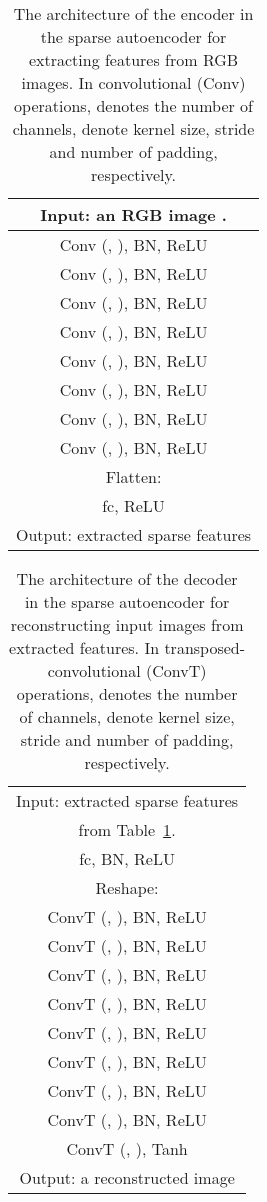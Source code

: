 \documentclass[final,12pt, 3p,times]{elsarticle}
\begin{document}
\begin{table}[h]
	\centering
	\caption{The architecture of the encoder in the sparse autoencoder for extracting features from  RGB images. In convolutional (Conv) operations,  denotes the number of channels,  denote kernel size, stride and number of padding, respectively. }
\begin{tabular}{c}
			\toprule
			Input: an RGB image . \\ 
			\hline
			Conv (, ), BN, ReLU \\\hline
			Conv (, ), BN, ReLU \\\hline
			Conv (, ), BN, ReLU \\\hline
			Conv (, ), BN, ReLU \\\hline
			Conv (, ), BN, ReLU \\\hline
			Conv (, ), BN, ReLU \\\hline
			Conv (, ), BN, ReLU \\\hline
			Conv (, ), BN, ReLU \\ \hline
			Flatten:  \\ \hline
			fc, ReLU \\\hline
			Output: extracted sparse features 
			\\ \bottomrule
		\end{tabular}\label{tab:SparseAE_encoder_64x64}\end{table}

\begin{table}[h]
	\centering
	\caption{The architecture of the decoder in the sparse autoencoder for reconstructing  input images from extracted features. In transposed-convolutional (ConvT) operations,  denotes the number of channels,  denote kernel size, stride and number of padding, respectively. }
\begin{tabular}{c}
			\toprule
			Input: extracted sparse features  
			\\ from Table~\ref{tab:SparseAE_encoder_64x64}. \\
			\hline
			fc, BN, ReLU \\\hline
			Reshape: \\ \hline
			ConvT (, ), BN, ReLU \\\hline
			ConvT (, ), BN, ReLU \\\hline
			ConvT (, ), BN, ReLU \\\hline
			ConvT (, ), BN, ReLU \\\hline
			ConvT (, ), BN, ReLU \\\hline
			ConvT (, ), BN, ReLU \\\hline
			ConvT (, ), BN, ReLU \\\hline
			ConvT (, ), BN, ReLU \\\hline
			ConvT (, ), Tanh
			\\ \hline
			Output: a reconstructed image 
			\\ \bottomrule
		\end{tabular}\label{tab:SparseAE_decoder_64x64}\end{table}
\end{document}

